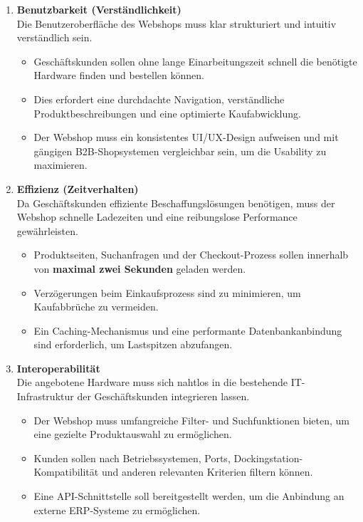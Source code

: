 \documentclass[%
	12pt,
	a4paper,
	oneside,
	parskip=full
]{scrbook}
\begin{document}
\begin{enumerate}
	\item \textbf{Benutzbarkeit (Verständlichkeit)} \\
	Die Benutzeroberfläche des Webshops muss klar strukturiert und intuitiv verständlich sein. 
	\begin{itemize}
		\item Geschäftskunden sollen ohne lange Einarbeitungszeit schnell die benötigte Hardware finden und bestellen können. 
		\item Dies erfordert eine durchdachte Navigation, verständliche Produktbeschreibungen und eine optimierte Kaufabwicklung.
		\item Der Webshop muss ein konsistentes UI/UX-Design aufweisen und mit gängigen B2B-Shopsystemen vergleichbar sein, um die Usability zu maximieren.
	\end{itemize}
	
	\item \textbf{Effizienz (Zeitverhalten)} \\
	Da Geschäftskunden effiziente Beschaffungslösungen benötigen, muss der Webshop schnelle Ladezeiten und eine reibungslose Performance gewährleisten.
	\begin{itemize}
		\item Produktseiten, Suchanfragen und der Checkout-Prozess sollen innerhalb von \textbf{maximal zwei Sekunden} geladen werden.
		\item Verzögerungen beim Einkaufsprozess sind zu minimieren, um Kaufabbrüche zu vermeiden.
		\item Ein Caching-Mechanismus und eine performante Datenbankanbindung sind erforderlich, um Lastspitzen abzufangen.
	\end{itemize}
	
	\item \textbf{Interoperabilität} \\
	Die angebotene Hardware muss sich nahtlos in die bestehende IT-Infrastruktur der Geschäftskunden integrieren lassen.
	\begin{itemize}
		\item Der Webshop muss umfangreiche Filter- und Suchfunktionen bieten, um eine gezielte Produktauswahl zu ermöglichen.
		\item Kunden sollen nach Betriebssystemen, Ports, Dockingstation-Kompatibilität und anderen relevanten Kriterien filtern können.
		\item Eine API-Schnittstelle soll bereitgestellt werden, um die Anbindung an externe ERP-Systeme zu ermöglichen.
	\end{itemize}
	

\end{enumerate}
\end{document}
